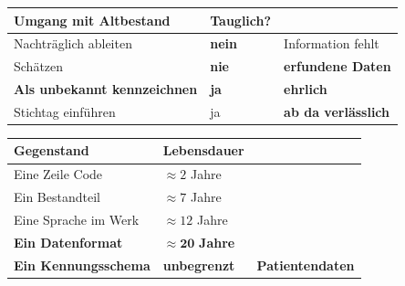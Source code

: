 \begin{aufgabe}
\begin{center}
\begin{minipage}{0.88\textwidth}
\end{minipage}
\end{center}

\begin{center}
\renewcommand{\arraystretch}{1.45}
\begin{tabular}{@{}P{3.0cm}P{2.2cm}P{2.8cm}@{}}
\toprule
\textbf{Umgang mit Altbestand} & \textbf{Tauglich?} & \\
\midrule
Nachträglich ableiten & \textcolor{akzent}{\textbf{nein}} & \textcolor{akzent}{Information fehlt}\\
Schätzen & \textcolor{akzent}{\textbf{nie}} & \textcolor{akzent}{\textbf{erfundene Daten}}\\
\textbf{Als unbekannt kennzeichnen} & \textcolor{gruen}{\textbf{ja}} & \textcolor{gruen}{\textbf{ehrlich}}\\
Stichtag einführen & \textcolor{gruen}{ja} & \textbf{ab da verlässlich}\\
\bottomrule
\end{tabular}
\end{center}

\begin{center}
\end{center}

\begin{warnung}
\begin{center}
\renewcommand{\arraystretch}{1.45}
\begin{tabular}{@{}P{2.8cm}P{2.2cm}P{2.6cm}@{}}
\toprule
\textbf{Gegenstand} & \textbf{Lebensdauer} & \\
\midrule
Eine Zeile Code & $\approx2$ Jahre & \\
Ein Bestandteil & $\approx7$ Jahre & \\
Eine Sprache im Werk & $\approx12$ Jahre & \\
\textbf{Ein Datenformat} & \textcolor{akzent}{$\approx\mathbf{20}$ \textbf{Jahre}} & \\
\textbf{Ein Kennungs\-schema} & \textcolor{akzent}{\textbf{unbegrenzt}} & \textcolor{akzent}{\textbf{Patientendaten}}\\
\bottomrule
\end{tabular}
\end{center}


\end{warnung}
\end{aufgabe}
